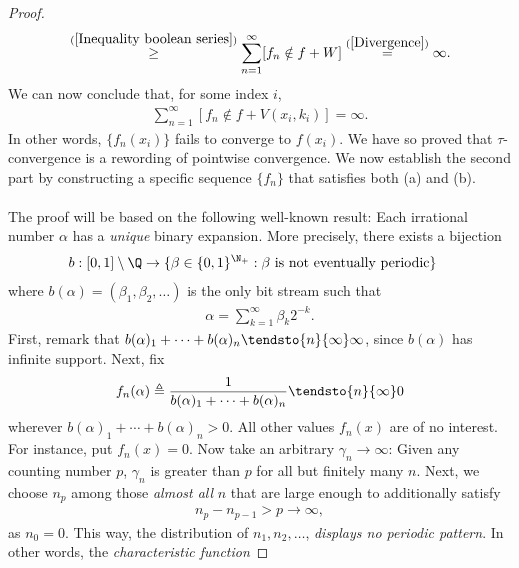 \begin{proof}
\begin{align}
      \overset{(\ref{Inequality boolean series})}{\geq}
  \sum_{n=1}^\infty [f_n \notin f + W]
    \overset{(\ref{Divergence})}{=}
  \infty .
\end{align}
%
We can now conclude that, for some index $i$, 
%
\begin{align}
  \sum_{n=1}^\infty [f_n \notin f + V(x_i, k_i)] = \infty .
\end{align}
%
In other words, $\{f_n(x_i)\}$ fails to converge to $f(x_i)$. We have so %
proved that $\tau$-convergence is a rewording of pointwise convergence. %
%
We now establish the second part by constructing a specific sequence %
$\{f_n\}$ that satisfies both (a) and (b). \\
\\
The proof will be based on the following well-known result: %
Each irrational number $\alpha$ has a \textit{unique} binary expansion. %
More precisely, there exists a bijection %
%
\begin{align}
  b: [0, 1] \setminus \Q &\to \{ 
      \beta \in \{0, 1\}^{\N_+}: \beta \text{ is not eventually periodic}
    \}
\end{align}
where %
%
  $b(\alpha) = (\beta_1, \beta_2, \dots)$ %
%
is the only bit stream such that %
%
\begin{align}
  \label{definition of alpha}
  \alpha = \sum_{k=1}^\infty \beta_k 2^{\minus k}.
\end{align}
%
First, remark that %
%
$b(\alpha)_1 + \dots + b(\alpha)_n \tendsto{n}{\infty}\infty$, %
%
since %
%
$b(\alpha)$
%
has infinite support. Next, fix %
%
\begin{equation}
  \label{definition of f_n(alpha)}
  f_n(\alpha)\triangleq %
  \frac{1}{b(\alpha)_1 + \cdots + b(\alpha)_n} \tendsto{n}{\infty} 0
\end{equation}
%
wherever $b(\alpha)_1+ \cdots + b(\alpha)_n > 0$. %
All other values $f_n(x)$ are of no interest. %
For instance, put $f_n(x) = 0$. %
%
Now take an arbitrary %
%
$\gamma_n \longrightarrow \infty$: %
%
Given any counting number $p$, $\gamma_n$ is greater than $p$ %
for all but finitely many $n$. %
%
Next, we choose $n_p$ among those \textit{almost all} $n$ that are 
large enough to additionally satisfy %
%
\begin{align}
  \label{definition of n_p}
  n_p - n_{p-1} > p \longrightarrow \infty, 
\end{align}
%
as $n_0=0$. This way, the distribution of %
%
  $n_1, n_2, \dots$, %
%
\textit{displays no periodic pattern}. %
In other words, the \textit{characteristic function} %

\end{proof}
